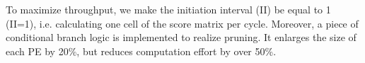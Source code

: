 To maximize throughput, we make the initiation interval (II) be equal to 1 (II=1), i.e. calculating one cell of the score matrix per cycle. 
Moreover, a piece of conditional branch logic is implemented to realize pruning. 
It enlarges the size of each PE by 20\%, but reduces computation effort by over 50\%.  
